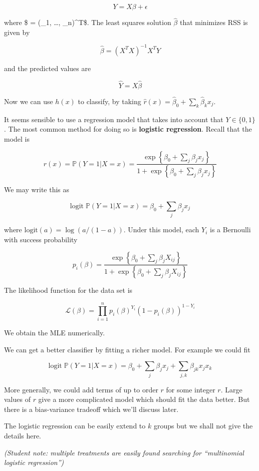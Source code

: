 \[ Y = X \beta + \epsilon \]

where \$ \epsilon = (\epsilon\_1, \dots, \epsilon\_n)\^{}T\$. The least
squares solution \(\hat{\beta}\) that minimizes RSS is given by

\[ \hat{\beta} = (X^T X)^{-1} X^T Y \]

and the predicted values are

\[ \hat{Y} = X \hat{\beta} \]

Now we can use \(h(x)\) to classify, by taking
\(\hat{r}(x) = \hat{\beta}_0 + \sum_k \hat{\beta}_k x_j\).

It seems sensible to use a regression model that takes into account that
\(Y \in \{ 0, 1 \}\). The most common method for doing so is
\textbf{logistic regression}. Recall that the model is

\[ r(x) = \mathbb{P}(Y = 1 | X = x) = \frac{\exp \left\{ \beta_0 + \sum_j \beta_j x_j \right\} }{1 + \exp \left\{ \beta_0 + \sum_j \beta_j x_j \right\} } \]

We may write this as

\[ \text{logit} \; \mathbb{P}(Y = 1 | X = x) = \beta_0 + \sum_j \beta_j x_j \]

where \(\text{logit}(a) = \log (a / (1 - a))\). Under this model, each
\(Y_i\) is a Bernoulli with success probability

\[ p_i(\beta) = \frac{\exp \left\{ \beta_0 + \sum_j \beta_j X_{ij} \right\} }{1 + \exp \left\{ \beta_0 + \sum_j \beta_j X_{ij} \right\} } \]

The likelihood function for the data set is

\[ \mathcal{L}(\beta) = \prod_{i=1}^n p_i(\beta)^{Y_i} (1 - p_i(\beta))^{1 - Y_i}\]

We obtain the MLE numerically.

We can get a better classifier by fitting a richer model. For example we
could fit

\[ \text{logit} \; \mathbb{P}(Y = 1 | X = x) = \beta_0 + \sum_j \beta_j x_j + \sum_{j, k} \beta_{jk} x_j x_k \]

More generally, we could add terms of up to order \(r\) for some integer
\(r\). Large values of \(r\) give a more complicated model which should
fit the data better. But there is a bias-variance tradeoff which we'll
discuss later.

The logistic regression can be easily extend to \(k\) groups but we
shall not give the details here.

\emph{(Student note: multiple treatments are easily found searching for
``multinomial logistic regression'')}

